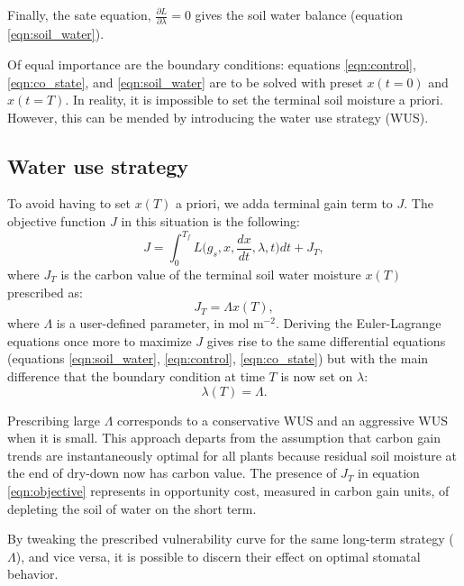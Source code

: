 \documentclass[utf8]{frontiersSCNS} %
\begin{document}
Finally, the sate equation, $\frac{\partial L}{\partial \lambda} = 0$ gives the soil water balance (equation \ref{eqn:soil_water}). 

Of equal importance are the boundary conditions: equations \ref{eqn:control}, \ref{eqn:co_state}, and \ref{eqn:soil_water} are to be solved with preset $x(t=0)$ and $x(t=T)$. In reality, it is impossible to set the terminal soil moisture a priori. However, this can be mended by introducing the water use strategy (WUS).

\subsection{Water use strategy}

To avoid having to set $x(T)$ a priori, we adda terminal gain term to $J$. The objective function $J$ in this situation is the following:
\begin{equation}
    \label{eqn:objective}
    J = \int_0^{T_f} L\Big(g_s, x, \frac{dx}{dt},\lambda,t \Big) dt + J_{T},
\end{equation}
where $J_{T}$ is the carbon value of the terminal soil water moisture $x(T)$ prescribed as:
\begin{equation}
    \label{eqn:terminal_gain}
    J_{T} = \Lambda x(T),
\end{equation}
where $\Lambda$ is a user-defined parameter, in mol m$^{-2}$. Deriving the Euler-Lagrange equations once more to maximize $J$ gives rise to the same differential equations (equations \ref{eqn:soil_water}, \ref{eqn:control}, \ref{eqn:co_state}) but with the main difference that the boundary condition at time $T$ is now set on $\lambda$: 
\begin{equation}
\label{eqn:WUS_BC}
\lambda(T) = \Lambda.
\end{equation}

Prescribing large $\Lambda$ corresponds to a conservative WUS and an aggressive WUS when it is small. This approach departs from the assumption that carbon gain trends are instantaneously optimal for all plants because residual soil moisture at the end of dry-down now has carbon value. The presence of $J_{T}$ in equation \ref{eqn:objective} represents in opportunity cost, measured in carbon gain units, of depleting the soil of water on the short term.

By tweaking the prescribed vulnerability curve for the same long-term strategy ($\Lambda$), and vice versa, it is possible to discern their effect on optimal stomatal behavior. 
\end{document}
